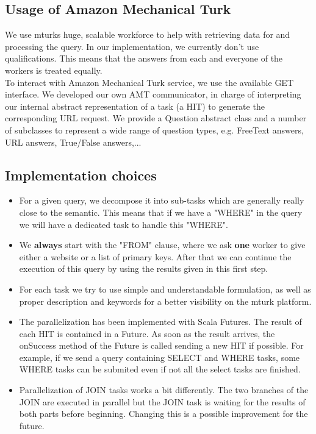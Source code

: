 \documentclass{article}
\begin{document}
\subsection{Usage of Amazon Mechanical Turk}
We use mturks huge, scalable workforce to help with retrieving data for and processing the query. In our implementation, we currently don't use qualifications. This means that the answers from each and everyone of the workers is treated equally.\\
To interact with Amazon Mechanical Turk service, we use the available GET interface. We developed our own AMT communicator, in charge of interpreting our internal abstract representation of a task (a HIT) to generate the corresponding URL request. We provide a Question abstract class and a number of subclasses to represent a wide range of question types, e.g. FreeText answers, URL answers, True/False answers,...
\subsection{Implementation choices}
\begin{itemize}
\item For a given query, we decompose it into sub-tasks which are generally really close to the semantic. This means that if we have a "WHERE" in the query we will have a dedicated task to handle this "WHERE".
\item We \textbf{always} start with the "FROM" clause, where we ask \textbf{one} worker to give either a website or a list of primary keys. After that we can continue the execution of this query by using the results given in this first step.
\item For each task we try to use simple and understandable formulation, as well as proper description and keywords for a better visibility on the mturk platform. 
\item The parallelization has been implemented with Scala Futures. The result of each HIT is contained in a Future. As soon as the result arrives, the onSuccess method of the Future is called sending a new HIT if possible. For example, if we send a query containing SELECT and WHERE tasks, some WHERE tasks can be submited even if not all the select tasks are finished.
\item Parallelization of JOIN tasks works a bit differently. The two branches of the JOIN are executed in parallel but the JOIN task is waiting for the results of both parts before beginning. Changing this is a possible improvement for the future.
\end{itemize}
\end{document}
